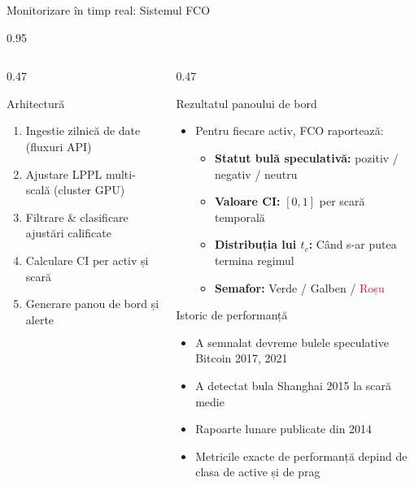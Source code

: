 \documentclass[9pt, aspectratio=169, t]{beamer}
\begin{document}
\begin{frame}{Monitorizare în timp real: Sistemul FCO}
\begin{cminipage}{0.95\textwidth}
{\begin{columns}[T]
\begin{column}{0.47\textwidth}
            \begin{exampleblock}{Arhitectură}
                \begin{enumerate}\setlength{\itemsep}{0pt}
                    \item Ingestie zilnică de date (fluxuri API)
                    \item Ajustare LPPL multi-scală (cluster GPU)
                    \item Filtrare \& clasificare ajustări calificate
                    \item Calculare CI per activ și scară
                    \item Generare panou de bord și alerte
                \end{enumerate}
            \end{exampleblock}
        \end{column}
        \begin{column}{0.47\textwidth}
            \begin{block}{Rezultatul panoului de bord}
                \begin{itemize}\setlength{\itemsep}{1pt}
                    \item Pentru fiecare activ, FCO raportează:
                    \begin{itemize}\setlength{\itemsep}{0pt}
                        \item \textbf{Statut bulă speculativă:} pozitiv / negativ / neutru
                        \item \textbf{Valoare CI:} $[0, 1]$ per scară temporală
                        \item \textbf{Distribuția lui $t_c$:} Când s-ar putea termina regimul
                        \item \textbf{Semafor:} \textcolor{Forest}{Verde} / \textcolor{Amber}{Galben} / \textcolor{Crimson}{Roșu}
                    \end{itemize}
                \end{itemize}
            \end{block}

            \begin{block}{Istoric de performanță}
                \begin{itemize}\setlength{\itemsep}{0pt}
                    \item A semnalat devreme bulele speculative Bitcoin 2017, 2021
                    \item A detectat bula Shanghai 2015 la scară medie
                    \item Rapoarte lunare publicate din 2014
                    \item Metricile exacte de performanță depind de clasa de active și de prag
                \end{itemize}
            \end{block}
        \end{column}
    \end{columns}
    }
    \end{cminipage}
\end{frame}
\end{document}
